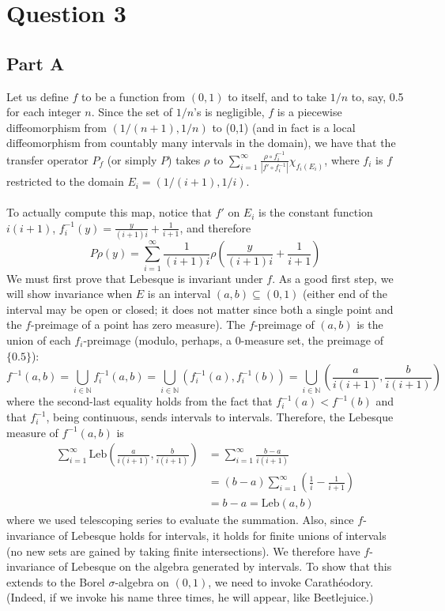 \documentclass[10pt,a4paper]{article}
\begin{document}
\section*{Question 3}
\subsection*{Part A}
Let us define $f$ to be a function from $(0,1)$ to itself, and to take $1/n$ to, say, 0.5 for each integer $n$. Since the set of $1/n$'s is negligible, $f$ is a piecewise diffeomorphism from $(1/(n+1),1/n)$ to (0,1) (and in fact is a local diffeomorphism from countably many intervals in the domain), we have that the transfer operator $P_f$ (or simply $P$) takes $\rho$ to $\displaystyle \sum_{i=1}^\infty \frac{\rho\circ f_i^{-1}}{|f'\circ f_i^{-1}|}\chi_{f_i(E_i)}$, where $f_i$ is $f$ restricted to the domain $E_i=(1/(i+1),1/i)$.\\\\
To actually compute this map, notice that $f'$ on $E_i$ is the constant function $i(i+1)$, $f_i^{-1}(y)=\frac{y}{(i+1)i}+\frac{1}{i+1}$, and therefore
$$ P\rho(y)=\sum_{i=1}^\infty \frac{1}{(i+1)i}\rho\left(\frac{y}{(i+1)i}+\frac{1}{i+1}\right)$$
We must first prove that Lebesque is invariant under $f$. As a good first step, we will show invariance when $E$ is an interval $(a,b)\subseteq(0,1)$ (either end of the interval may be open or closed; it does not matter since both a single point and the $f$-preimage of a point has zero measure). The $f$-preimage of $(a,b)$ is the union of each $f_i$-preimage (modulo, perhaps, a 0-measure set, the preimage of $\{0.5\}$):
$$f^{-1}(a,b)=\bigcup_{i\in\mathbb{N}} f_i^{-1}(a,b)=\bigcup_{i\in\mathbb{N}} (f_i^{-1}(a),f_i^{-1}(b))=\bigcup_{i\in\mathbb{N}} \left(\frac{a}{i(i+1)},\frac{b}{i(i+1)}\right)$$
where the second-last equality holds from the fact that $f_i^{-1}(a)<f^{-1}(b)$ and that $f^{-1}_i$, being continuous, sends intervals to intervals. Therefore, the Lebesque measure of $f^{-1}(a,b)$ is
\begin{align*}\sum_{i=1}^\infty \text{Leb}\left(\frac{a}{i(i+1)},\frac{b}{i(i+1)}\right)&=\sum_{i=1}^\infty\frac{b-a}{i(i+1)}\\&=(b-a)\sum^\infty_{i=1}\left(\frac{1}{i}-\frac{1}{i+1}\right)\\&=b-a=\text{Leb}(a,b)\end{align*}
where we used telescoping series to evaluate the summation. Also, since $f$-invariance of Lebesque holds for intervals, it holds for finite unions of intervals (no new sets are gained by taking finite intersections). We therefore have $f$-invariance of Lebesque on the algebra generated by intervals. To show that this extends to the Borel $\sigma$-algebra on $(0,1)$, we need to invoke Carath\'eodory. (Indeed, if we invoke his name three times, he will appear, like Beetlejuice.)\\\\
\end{document}
